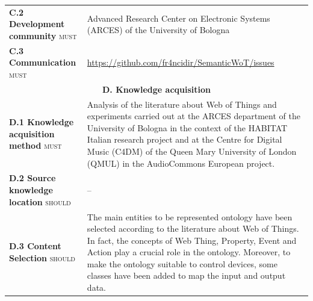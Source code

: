 \begin{table}
\begin{tabular}{p{}p{}}
\\
\textbf{C.2 Development community} \textsc{must} & Advanced Research Center on Electronic Systems (ARCES) of the University of Bologna  \\
\textbf{C.3 Communication} \textsc{must}  & \url{https://github.com/fr4ncidir/SemanticWoT/issues} \\
\midrule
\multicolumn{2}{c}{\textbf{D. Knowledge acquisition}} \\ \midrule
\textbf{D.1 Knowledge acquisition method} \textsc{must}  & Analysis of the literature about Web of Things and experiments carried out at the ARCES department of the University of Bologna in the context of the HABITAT Italian research project and at the Centre for Digital Music (C4DM) of the Queen Mary University of London (QMUL) in the AudioCommons European project. \\
\textbf{D.2 Source knowledge location} \textsc{should}  & -- \\
\textbf{D.3 Content Selection} \textsc{should}  & The main entities to be represented ontology have been selected according to the literature about Web of Things. In fact, the concepts of Web Thing, Property, Event and Action play a crucial role in the ontology. Moreover, to make the ontology suitable to control devices, some classes have been added to map the input and output data. \\
\toprule
\end{tabular}
\end{table}

